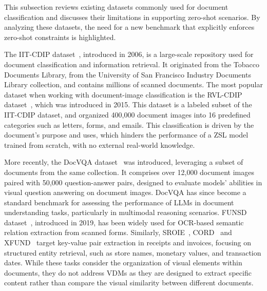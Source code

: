This subsection reviews existing datasets commonly used for document classification and discusses their limitations in supporting zero-shot scenarios. By analyzing these datasets, the need for a new benchmark that explicitly enforces zero-shot constraints is highlighted.

The IIT-CDIP dataset~\cite{lewis_iit-cdip_2006}, introduced in 2006, is a large-scale repository used for document classification and information retrieval. It originated from the Tobacco Documents Library, from the University of San Francisco Industry Documents Library collection, and contains millions of scanned documents. The most popular dataset when working with document-image classification is the RVL-CDIP dataset~\cite{harley_evaluation_2015}, which was introduced in 2015. This dataset is a labeled subset of the IIT-CDIP dataset, and organized 400,000 document images into 16 predefined categories such as letters, forms, and emails. This classification is driven by the document's purpose and uses, which hinders the performance of a ZSL model trained from scratch, with no external real-world knowledge.

More recently, the DocVQA dataset~\cite{mathew_docvqa_2021} was introduced, leveraging a subset of documents from the same collection. It comprises over 12,000 document images paired with 50,000 question-answer pairs, designed to evaluate models’ abilities in visual question answering on document images. DocVQA has since become a standard benchmark for assessing the performance of \glspl{LLM} in document understanding tasks, particularly in multimodal reasoning scenarios. FUNSD dataset~\cite{jaume_funsd_2019}, introduced in 2019, has been widely used for OCR-based semantic relation extraction from scanned forms. Similarly, SROIE~\cite{huang_icdar2019_2019}, CORD~\cite{park_cord_2019} and XFUND~\cite{xu_layoutxlm_2021} target key-value pair extraction in receipts and invoices, focusing on structured entity retrieval, such as store names, monetary values, and transaction dates. While these tasks consider the organization of visual elements within documents, they do not address \glspl{VDM} as they are designed to extract specific content rather than compare the visual similarity between different documents.

